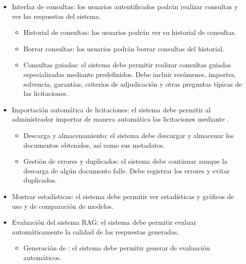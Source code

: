 \begin{itemize}
\begin{itemize}
		\item {} Roles: el sistema debe permitir asignar a los usuarios el rol de administradores o usuarios normales.
		\item {} Administradores: los administradores deben poder añadir usuarios, eliminarlos y cambiar su rol.
		\item {} Edición de datos de usuario: los usuarios deben poder editar sus datos.
		\item {} Recuperación de contraseña: los usuarios deben poder cambiar su contraseña utilizando su correo.
	\end{itemize}
	\item {} Interfaz de consultas: los usuarios autentificados podrán realizar consultas y ver las respuestas del sistema.
	\begin{itemize}
	\tightlist
		\item {} Historial de consultas: los usuarios podrán ver su historial de consultas.
		\item {} Borrar consultas: los usuarios podrán borrar consultas del historial.
		\item {} Consultas guiadas: el sistema debe permitir realizar consultas guiadas especializadas mediante  predefinidos. Debe incluir resúmenes, importes, solvencia, garantías, criterios de adjudicación y otras preguntas típicas de las licitaciones. 
	\end{itemize}
	\item {} Importación automática de licitaciones: el sistema debe permitir al administrador importar de manera automática las licitaciones mediante .
	\begin{itemize}
	\tightlist
		\item {} Descarga y almacenamiento: el sistema debe descargar y almacenar los documentos obtenidos, así como sus metadatos.
		\item {} Gestión de errores y duplicados: el sistema debe continuar aunque la descarga de algún documento falle. Debe registrar los errores y evitar duplicados.
	\end{itemize}
	\item {} Mostrar estadísticas: el sistema debe permitir ver estadísticas y gráficos de uso y de comparación de modelos.
	\item {} Evaluación del sistema RAG: el sistema debe permitir evaluar automáticamente la calidad de las respuestas generadas. 
	\begin{itemize}
	\tightlist
		\item {} Generación de : el sistema debe permitir generar  de evaluación automáticos.
	\end{itemize}
\end{itemize}

